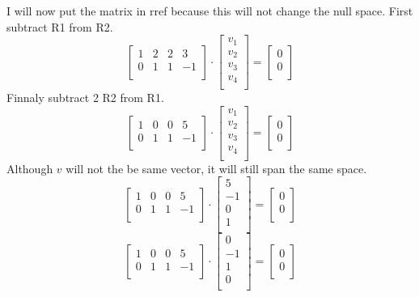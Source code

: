 \documentclass{article}
\begin{document}
I will now put the matrix in rref because this will not change the null space. First subtract R1 from R2.
\[
\begin{bmatrix}
1 & 2 & 2 & 3 \\
0 & 1 & 1 & -1 \\
\end{bmatrix}
\cdot
\begin{bmatrix}
v_1 \\
v_2 \\
v_3 \\
v_4 \\
\end{bmatrix}
=
\begin{bmatrix}
0 \\
0 \\
\end{bmatrix}
\]
Finnaly subtract 2 R2 from R1.
\[
\begin{bmatrix}
1 & 0 & 0 & 5 \\
0 & 1 & 1 & -1 \\
\end{bmatrix}
\cdot
\begin{bmatrix}
v_1 \\
v_2 \\
v_3 \\
v_4 \\
\end{bmatrix}
=
\begin{bmatrix}
0 \\
0 \\
\end{bmatrix}
\]
Although $v$ will not the be same vector, it will still span the same space.
\[
\begin{bmatrix}
1 & 0 & 0 & 5 \\
0 & 1 & 1 & -1 \\
\end{bmatrix}
\cdot
\begin{bmatrix}
5 \\
-1 \\
0 \\
1 \\
\end{bmatrix}
=
\begin{bmatrix}
0 \\
0 \\
\end{bmatrix}
\]
\[
\begin{bmatrix}
1 & 0 & 0 & 5 \\
0 & 1 & 1 & -1 \\
\end{bmatrix}
\cdot
\begin{bmatrix}
0 \\
-1 \\
1 \\
0 \\
\end{bmatrix}
=
\begin{bmatrix}
0 \\
0 \\
\end{bmatrix}
\]
\end{document}
